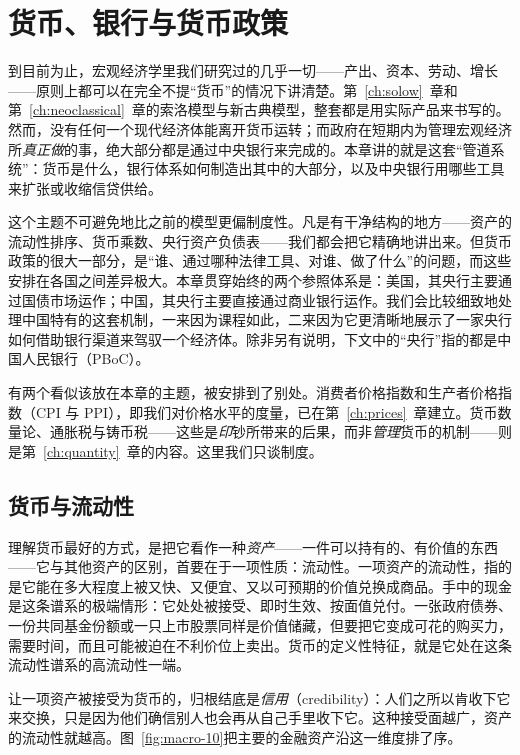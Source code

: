 \chapter{货币、银行与货币政策}
\label{ch:money}

到目前为止，宏观经济学里我们研究过的几乎一切——产出、资本、劳动、增长——原则上都可以在完全不提“货币”的情况下讲清楚。第~\ref{ch:solow}~章和第~\ref{ch:neoclassical}~章的索洛模型与新古典模型，整套都是用实际产品来书写的。然而，没有任何一个现代经济体能离开货币运转；而政府在短期内为管理宏观经济所\emph{真正做}的事，绝大部分都是通过中央银行来完成的。本章讲的就是这套“管道系统”：货币是什么，银行体系如何制造出其中的大部分，以及中央银行用哪些工具来扩张或收缩信贷供给。

这个主题不可避免地比之前的模型更偏制度性。凡是有干净结构的地方——资产的流动性排序、货币乘数、央行资产负债表——我们都会把它精确地讲出来。但货币政策的很大一部分，是“谁、通过哪种法律工具、对谁、做了什么”的问题，而这些安排在各国之间差异极大。本章贯穿始终的两个参照体系是：美国，其央行主要通过国债市场运作；中国，其央行主要直接通过商业银行运作。我们会比较细致地处理中国特有的这套机制，一来因为课程如此，二来因为它更清晰地展示了一家央行如何借助银行渠道来驾驭一个经济体。除非另有说明，下文中的“央行”指的都是中国人民银行（PBoC）。

有两个看似该放在本章的主题，被安排到了别处。消费者价格指数和生产者价格指数（CPI 与 PPI），即我们对价格水平的度量，已在第~\ref{ch:prices}~章建立。货币数量论、通胀税与铸币税——这些是\emph{印}钞所带来的后果，而非\emph{管理}货币的机制——则是第~\ref{ch:quantity}~章的内容。这里我们只谈制度。

\section{货币与流动性}

理解货币最好的方式，是把它看作一种\emph{资产}——一件可以持有的、有价值的东西——它与其他资产的区别，首要在于一项性质：流动性。一项资产的流动性，指的是它能在多大程度上被又快、又便宜、又以可预期的价值兑换成商品。手中的现金是这条谱系的极端情形：它处处被接受、即时生效、按面值兑付。一张政府债券、一份共同基金份额或一只上市股票同样是价值储藏，但要把它变成可花的购买力，需要时间，而且可能被迫在不利价位上卖出。货币的定义性特征，就是它处在这条流动性谱系的高流动性一端。

让一项资产被接受为货币的，归根结底是\emph{信用}（credibility）：人们之所以肯收下它来交换，只是因为他们确信别人也会再从自己手里收下它。这种接受面越广，资产的流动性就越高。图~\ref{fig:macro-10}把主要的金融资产沿这一维度排了序。

